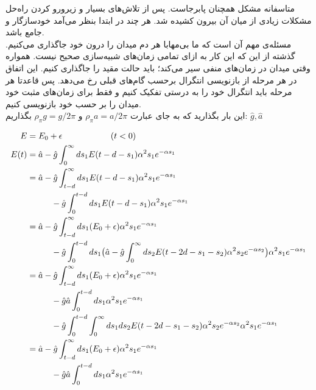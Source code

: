 متاسفانه مشکل همچنان پابرجاست. پس از تلاش‌های بسیار و زیرورو کردن راه‌حل مشکلات زیادی از میان آن بیرون کشیده شد. هر چند در ابتدا بنظر می‌آمد خودسازگار و جامع باشد.\\
مسئله‌ی مهم آن است که ما بی‌مهابا هر دم میدان را درون خود جاگذاری می‌کنیم. گذشته از این که این کار به ازای تمامی زمان‌های شبیه‌سازی صحیح نیست. همواره وقتی میدان در زمان‌های منفی سیر می‌کند؛ باید حالت مقید را جاگذاری کنیم. این اتفاق در هر مرحله از بازنویسی انتگرال برحسب گام‌های قبلی رخ می‌دهد. پس قاعدتا هر مرحله باید انتگرال خود را به درستی تفکیک کنیم و فقط برای زمان‌های مثبت خود میدان را بر حسب خود بازنویسی کنیم.\\
این بار بگذارید که به جای عبارت
$\rho_{\pi} a = a/2\pi$
و
$\rho_{\pi} g =  g/2\pi$
بگذاریم:
$\hat{g}, \hat{a}$

\begin{align}
	E &= E_0 + \epsilon \hspace{2cm} (t<0) \\
	E(t) &= \hat{a} - \hat{g} \int_{0}^{\infty} ds_1 E(t - d - s_1) \alpha^2 s_1 e^{-\alpha s_1} \\
	&= \hat{a} - \hat{g} \int_{t - d}^{\infty} ds_1 E(t - d - s_1) \alpha^2 s_1 e^{-\alpha s_1} \\
	&\hspace{1 cm} - \hat{g} \int_{0}^{t - d} ds_1 E(t - d - s_1) \alpha^2 s_1 e^{-\alpha s_1} \\
	&= \hat{a} - \hat{g} \int_{t - d}^{\infty} ds_1 ( E_0 + \epsilon ) \alpha^2 s_1 e^{-\alpha s_1}\\
	& \hspace{1 cm} - \hat{g} \int_{0}^{t - d} ds_1 \big( \hat{a} - \hat{g} \int_{0}^{\infty} ds_2 E(t - 2d - s_1 - s_2) \alpha^2 s_2 e^{-\alpha s_2} \big) \alpha^2 s_1 e^{-\alpha s_1} \\
	&= \hat{a} - \hat{g} \int_{t - d}^{\infty} ds_1 ( E_0 + \epsilon ) \alpha^2 s_1 e^{-\alpha s_1}\\
	& \hspace{1 cm} - \hat{g} \hat{a} \int_{0}^{t - d} ds_1 \alpha^2 s_1 e^{-\alpha s_1}\\
	& \hspace{1 cm} - \hat{g} \int_{0}^{t - d} \int_{0}^{\infty} ds_1 ds_2 E(t - 2d - s_1 - s_2) \alpha^2 s_2 e^{-\alpha s_2} \alpha^2 s_1 e^{-\alpha s_1} \\
	&= \hat{a} - \hat{g} \int_{t - d}^{\infty} ds_1 ( E_0 + \epsilon ) \alpha^2 s_1 e^{-\alpha s_1}\\
	& \hspace{1 cm} - \hat{g} \hat{a} \int_{0}^{t - d} ds_1 \alpha^2 s_1 e^{-\alpha s_1}\\

\end{align}
